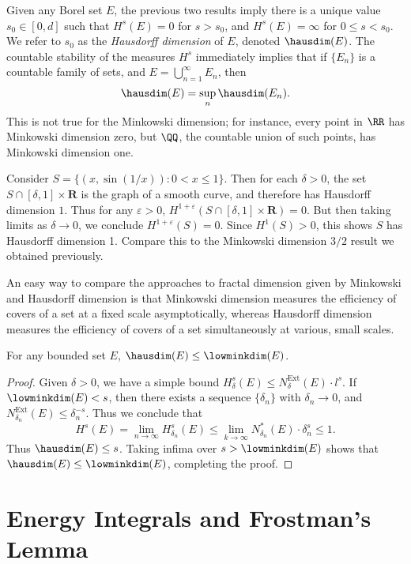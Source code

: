Given any Borel set $E$, the previous two results imply there is a unique value $s_0 \in [0,d]$ such that $H^s(E) = 0$ for $s > s_0$, and $H^s(E) = \infty$ for $0 \leq s < s_0$. We refer to $s_0$ as the \emph{Hausdorff dimension} of $E$, denoted $\hausdim(E)$. The countable stability of the measures $H^s$ immediately implies that if $\{ E_n \}$ is a countable family of sets, and $E = \bigcup_{n = 1}^\infty E_n$, then
%
\[ \hausdim(E) = \sup_n \hausdim(E_n). \]
%
This is not true for the Minkowski dimension; for instance, every point in $\RR$ has Minkowski dimension zero, but $\QQ$, the countable union of such points, has Minkowski dimension one.

\begin{example}
	Consider $S = \{ (x,\sin(1/x)) : 0 < x \leq 1 \}$. Then for each $\delta > 0$, the set $S \cap [\delta,1] \times \mathbf{R}$ is the graph of a smooth curve, and therefore has Hausdorff dimension $1$. Thus for any $\varepsilon > 0$, $H^{1 + \varepsilon}(S \cap [\delta,1] \times \mathbf{R}) = 0$. But then taking limits as $\delta \to 0$, we conclude $H^{1+\varepsilon}(S) = 0$. Since $H^1(S) > 0$, this shows $S$ has Hausdorff dimension 1. Compare this to the Minkowski dimension $3/2$ result we obtained previously.
\end{example}

An easy way to compare the approaches to fractal dimension given by Minkowski and Hausdorff dimension is that Minkowski dimension measures the efficiency of covers of a set at a fixed scale asymptotically, whereas Hausdorff dimension measures the efficiency of covers of a set simultaneously at various, small scales.

\begin{theorem}
	For any bounded set $E$, $\hausdim(E) \leq \lowminkdim(E)$.
\end{theorem}
\begin{proof}
	Given $\delta > 0$, we have a simple bound $H^s_\delta(E) \leq N_\delta^{\text{Ext}}(E) \cdot l^s$. If $\lowminkdim(E) < s$, then there exists a sequence $\{ \delta_n \}$ with $\delta_n \to 0$, and $N_{\delta_n}^{\text{Ext}}(E) \leq \delta_n^{-s}$. Thus we conclude that
	\[ H^s(E) = \lim_{n \to \infty} H^s_{\delta_n}(E) \leq \lim_{k \to \infty} N_{\delta_n}^*(E) \cdot \delta_n^s \leq 1. \]
	Thus $\hausdim(E) \leq s$. Taking infima over $s > \lowminkdim(E)$ shows that $\hausdim(E) \leq \lowminkdim(E)$, completing the proof.
\end{proof}

\section{Energy Integrals and Frostman's Lemma}

